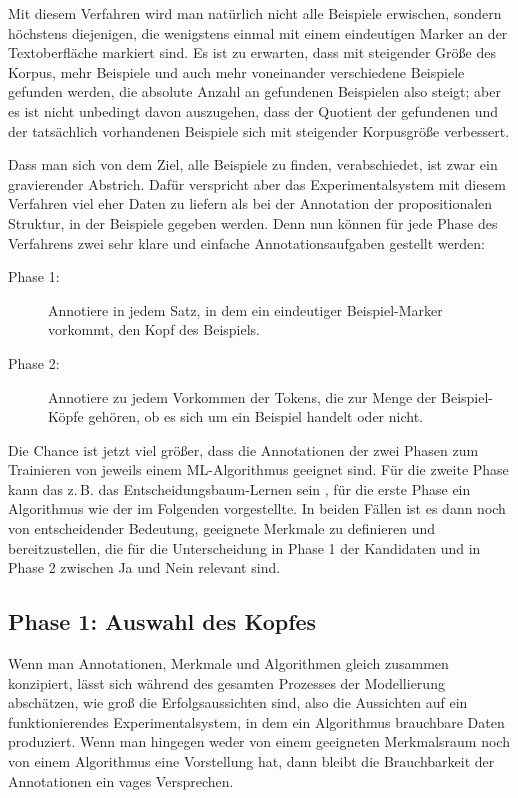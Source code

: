 \documentclass{article}
\begin{document}
Mit diesem Verfahren wird man natürlich nicht alle Beispiele
erwischen, sondern höchstens diejenigen, die wenigstens einmal mit
einem eindeutigen Marker an der Textoberfläche markiert sind. Es ist
zu erwarten, dass mit steigender Größe des Korpus, mehr Beispiele und
auch mehr voneinander verschiedene Beispiele gefunden werden, die
absolute Anzahl an gefundenen Beispielen also steigt; aber es ist
nicht unbedingt davon auszugehen, dass der Quotient der gefundenen und
der tatsächlich vorhandenen Beispiele sich mit steigender Korpusgröße
verbessert.

Dass man sich von dem Ziel, alle Beispiele zu finden, verabschiedet,
ist zwar ein gravierender Abstrich. Dafür verspricht aber das
Experimentalsystem mit diesem Verfahren viel eher Daten zu liefern als
bei der Annotation der propositionalen Struktur, in der Beispiele
gegeben werden. Denn nun können für jede Phase des Verfahrens zwei
sehr klare und einfache Annotationsaufgaben gestellt werden:
\begin{description}
\item[Phase 1:] Annotiere in jedem Satz, in dem ein eindeutiger
  Beispiel-Marker vorkommt, den Kopf des Beispiels.
\item[Phase 2:] Annotiere zu jedem Vorkommen der Tokens, die zur Menge
  der Beispiel-Köpfe gehören, ob es sich um ein Beispiel handelt oder
  nicht.
\end{description}
Die Chance ist jetzt viel größer, dass die Annotationen der zwei
Phasen zum Trainieren von jeweils einem ML-Algorithmus geeignet
sind. Für die zweite Phase kann das z.\,B. das
Entscheidungsbaum-Lernen sein \parencite[105--120]{Beierle2014a}, für
die erste Phase ein Algorithmus wie der im Folgenden vorgestellte. In
beiden Fällen ist es dann noch von entscheidender Bedeutung, geeignete
Merkmale zu definieren und bereitzustellen, die für die Unterscheidung
in Phase 1 der Kandidaten und in Phase 2 zwischen Ja und Nein relevant
sind.

\subsection{Phase 1: Auswahl des Kopfes}

Wenn man Annotationen, Merkmale und Algorithmen gleich zusammen
konzipiert, lässt sich während des gesamten Prozesses der Modellierung
abschätzen, wie groß die Erfolgsaussichten sind, also die Aussichten
auf ein funktionierendes Experimentalsystem, in dem ein Algorithmus
brauchbare Daten produziert. Wenn man hingegen weder von einem
geeigneten Merkmalsraum noch von einem Algorithmus eine Vorstellung
hat, dann bleibt die Brauchbarkeit der Annotationen ein vages
Versprechen.
\end{document}

